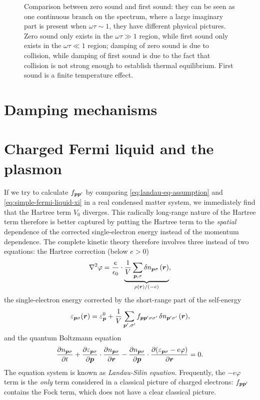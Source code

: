 \documentclass[hyperref, a4paper]{article}
\begin{document}
\begin{figure}
    \centering
    
    \caption{Comparison between zero sound and first sound: 
    they can be seen as one continuous branch 
    on the spectrum, 
    where a large imaginary part is present when $\omega \tau \sim 1$,
    they have different physical pictures.
    Zero sound only exists in the $\omega \tau \gg 1$ region,
    while first sound only exists in the $\omega \tau \ll 1$ region;
    damping of zero sound is due to collision,
    while damping of first sound is due to the fact that
    collision is not strong enough to establish thermal equilibrium.
    First sound is a finite temperature effect.}
    \label{fig:sound-comparison}
\end{figure}

\section{Damping mechanisms}



\section{Charged Fermi liquid and the plasmon}\label{sec:charged-fermi-liquid}

If we try to calculate $f_{\vb*{p} \vb*{p}'}$ by 
comparing \eqref{eq:landau-eq-assumption} and \eqref{eq:simple-fermi-liquid-xi}
in a real condensed matter system,
we immediately find that the Hartree term $V_0$ diverges.
This radically long-range nature of the Hartree term therefore 
is better captured by 
putting the Hartree term to the 
\emph{spatial} dependence of the corrected single-electron energy 
instead of the momentum dependence.
The complete kinetic theory therefore involves three instead of two equations:
the Hartree correction (below $e > 0$)
\begin{equation}
    \laplacian \varphi = \frac{e}{\epsilon_0} 
    \cdot \underbrace{
        \frac{1}{V} \sum_{\vb*{p}, \sigma} \var{n}_{\vb*{p} \sigma}(\vb*{r})
    }_{\rho(\vb*{r}) / (-e)},
\end{equation}
the single-electron energy corrected by 
the short-range part of the self-energy
\begin{equation}
    \varepsilon_{\vb*{p} \sigma}(\vb*{r}) = \varepsilon^0_{\vb*{p}} 
        + \frac{1}{V} \sum_{\vb*{p}', \sigma'} 
        f_{\vb*{p} \vb*{p}' \sigma \sigma'} \var{n}_{\vb*{p}' \sigma'}(\vb*{r}),
\end{equation}
and the quantum Boltzmann equation 
\begin{equation}
    \pdv{{n}_{\vb*{p} \sigma}}{t}  
    + \pdv{\varepsilon_{\vb*{p} \sigma}}{\vb*{p}} \cdot \pdv{{n}_{\vb*{p} \sigma}}{\vb*{r}}
    - \pdv{{n}_{\vb*{p} \sigma}}{\vb*{p}} \cdot \pdv{(\varepsilon_{\vb*{p} \sigma} - e \varphi)}{\vb*{r}} = 0.
\end{equation}
The equation system is known as \emph{Landau-Silin equation}.
Frequently, the $-e \varphi$ term is the \emph{only} term 
considered in a classical picture of charged electrons:
$f_{\vb*{p} \vb*{p}'}$ contains the Fock term,
which does not have a clear classical picture.
\end{document}
